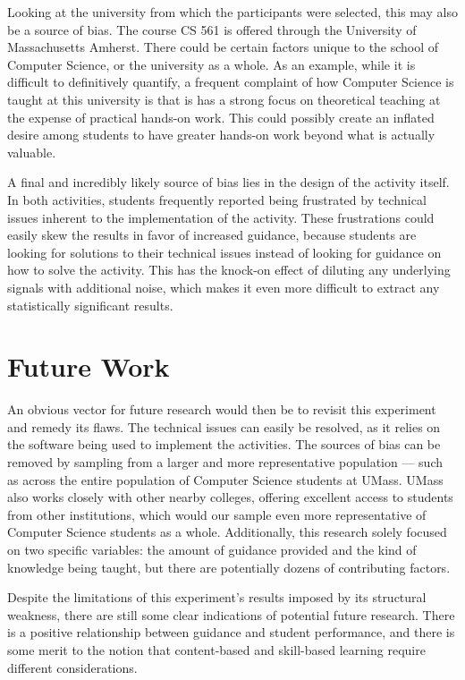     Looking at the university from which the participants were selected, this may also be a source of bias. 
    The course CS 561 is offered through the University of Massachusetts Amherst.
    There could be certain factors unique to the school of Computer Science, or the university as a whole.
    As an example, while it is difficult to definitively quantify, a frequent complaint of how Computer Science is taught at this university is that is has a strong focus on theoretical teaching at the expense of practical hands-on work. 
    This could possibly create an inflated desire among students to have greater hands-on work beyond what is actually valuable. 
    
    A final and incredibly likely source of bias lies in the design of the activity itself. 
    In both activities, students frequently reported being frustrated by technical issues inherent to the implementation of the activity. 
    These frustrations could easily skew the results in favor of increased guidance, because students are looking for solutions to their technical issues instead of looking for guidance on how to solve the activity. 
    This has the knock-on effect of diluting any underlying signals with additional noise, which makes it even more difficult to extract any statistically significant results.

\section{Future Work}
    An obvious vector for future research would then be to revisit this experiment and remedy its flaws. 
    The technical issues can easily be resolved, as it relies on the software being used to implement the activities. 
    The sources of bias can  be removed by sampling from a larger and more representative population --- 
    such as across the entire population of Computer Science students at UMass. 
    UMass also works closely with other nearby colleges, offering excellent access to students from other institutions, which would our sample even more representative of Computer Science students as a whole. 
    Additionally, this research solely focused on two specific variables: 
    the amount of guidance provided and the kind of knowledge being taught, but there are potentially dozens of contributing factors. 

    Despite the limitations of this experiment's results imposed by its structural weakness, there are still some clear indications of potential future research. 
    There is a positive relationship between guidance and student performance, and there is some merit to the notion that content-based and skill-based learning require different considerations. 
    
